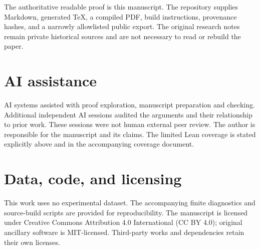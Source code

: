 \documentclass[11pt,a4paper]{article}
\numberwithin{equation}{section}
\begin{document}
The authoritative readable proof is this manuscript. The repository
supplies Markdown, generated TeX, a compiled PDF, build instructions,
provenance hashes, and a narrowly allowlisted public export. The
original research notes remain private historical sources and are not
necessary to read or rebuild the paper.

\section*{AI assistance}\label{ai-assistance}

AI systems assisted with proof exploration, manuscript preparation and
checking. Additional independent AI sessions audited the arguments and
their relationship to prior work. These sessions were not human external
peer review. The author is responsible for the manuscript and its
claims. The limited Lean coverage is stated explicitly above and in the
accompanying coverage document.

\section*{Data, code, and licensing}\label{data-code-and-licensing}

This work uses no experimental dataset. The accompanying finite
diagnostics and source-build scripts are provided for reproducibility.
The manuscript is licensed under Creative Commons Attribution 4.0
International (CC BY 4.0); original ancillary software is MIT-licensed.
Third-party works and dependencies retain their own licenses.


\end{document}
